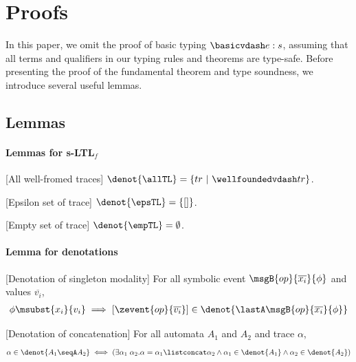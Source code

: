 \newpage
\section{Proofs}\label{sec:tech:proof}

In this paper, we omit the proof of basic typing \(\basicvdash e : s\), assuming that all terms and qualifiers in our typing rules and theorems are type-safe. Before presenting the proof of the fundamental theorem and type soundness, we introduce several useful lemmas.

\subsection{Lemmas}

\paragraph{Lemmas for s-LTL$_f$} 

\begin{lemma}\label{lemma:allTL}[All well-fromed traces] $\denot{\allTL} = \{ tr ~|~ \wellfoundedvdash tr  \}$.
\end{lemma}

\begin{lemma}\label{lemma:espTL}[Epsilon set of trace] $\denot{\epsTL} = \{ [] \}$.
\end{lemma}

\begin{lemma}\label{lemma:empTL}[Empty set of trace] $\denot{\empTL} = \emptyset$.
\end{lemma}

\paragraph{Lemma for denotations}

\begin{lemma}\label{lemma:lastA-denot}[Denotation of singleton modality] For all symbolic event $\msgB{op}{\overline{x_i}}{\phi}$ and values $\overline{v_i}$,
{\small\begin{align*}
    \phi\msubst{x_i}{v_i} \implies
    [\zevent{op}{\overline{v_i}}] \in \denot{\lastA\msgB{op}{\overline{x_i}}{\phi}}
\end{align*}}
\end{lemma}

\begin{lemma}\label{lemma:seqA-denot}[Denotation of concatenation] For all automata $A_1$ and $A_2$ and trace $\alpha$,
{\small\begin{align*}
    \alpha \in \denot{A_1 \seqA A_2} \iff (\exists \alpha_1\;\alpha_2. \alpha = \alpha_1 \listconcat \alpha_2 \land \alpha_1 \in \denot{A_1} \land \alpha_2 \in \denot{A_2})
\end{align*}}
\end{lemma}

